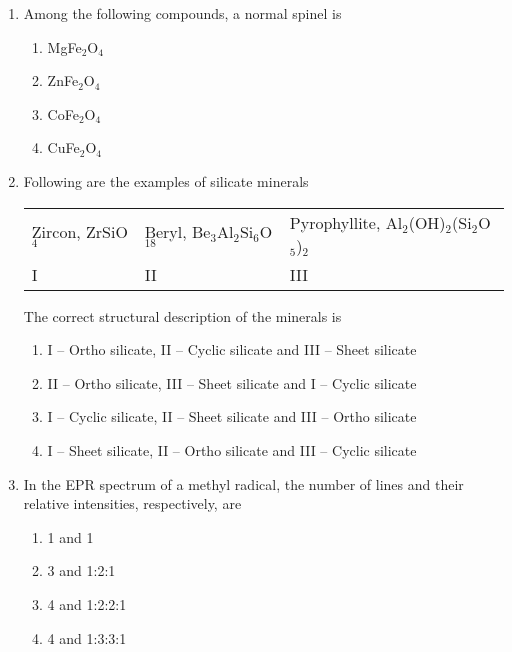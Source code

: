 \documentclass[12pt]{article}
\begin{document}
\begin{enumerate}[label=Q.\arabic*]
	\item Among the following compounds, a normal spinel is  
	\begin{enumerate}
	\item MgFe$_2$O$_4$
	\item ZnFe$_2$O$_4$
	\item CoFe$_2$O$_4$
	\item CuFe$_2$O$_4$
	\end{enumerate}

	\item Following are the examples of silicate minerals

	\begin{tabular}{lll}
	Zircon, ZrSiO$_4$ & Beryl, Be$_3$Al$_2$Si$_6$O$_{18}$ & Pyrophyllite, Al$_2$(OH)$_2$(Si$_2$O$_5$)$_2$ \\
		I & II & III
		\end{tabular}

		The correct structural description of the minerals is  
		\begin{enumerate}
		\item I – Ortho silicate, II – Cyclic silicate and III – Sheet silicate
		\item II – Ortho silicate, III – Sheet silicate and I – Cyclic silicate
		\item I – Cyclic silicate, II – Sheet silicate and III – Ortho silicate
		\item I – Sheet silicate, II – Ortho silicate and III – Cyclic silicate
		\end{enumerate}

		\item In the EPR spectrum of a methyl radical, the number of lines and their relative intensities, respectively, are  
		\begin{enumerate}
		\item 1 and 1
		\item 3 and 1:2:1
		\item 4 and 1:2:2:1
		\item 4 and 1:3:3:1
		\end{enumerate}


\end{enumerate}
\end{document}
